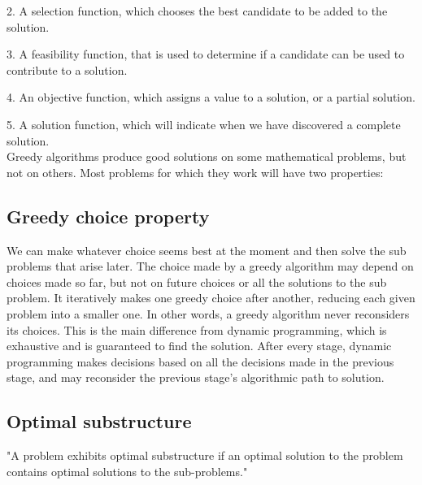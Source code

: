 \documentclass[conference]{IEEEtran}
\begin{document}
2.	A selection function, which chooses the best candidate to be added to the solution.

3.	A feasibility function, that is used to determine if a candidate can be used to contribute to a solution.

4.	An objective function, which assigns a value to a solution, or a partial solution.

5.	A solution function, which will indicate when we have discovered a complete solution.\\

Greedy algorithms produce good solutions on some mathematical problems, but not on others. Most problems for which they work will have two properties:

\subsection{Greedy choice property }

We can make whatever choice seems best at the moment and then solve the sub problems that arise later. The choice made by a greedy algorithm may depend on choices made so far, but not on future choices or all the solutions to the sub problem. It iteratively makes one greedy choice after another, reducing each given problem into a smaller one. In other words, a greedy algorithm never reconsiders its choices. This is the main difference from dynamic programming, which is exhaustive and is guaranteed to find the solution.
After every stage, dynamic programming makes decisions based on all the decisions made in the previous stage, and may reconsider the previous stage's algorithmic path to solution.


\subsection{Optimal substructure }

"A problem exhibits optimal substructure if an optimal solution to the problem contains optimal solutions to the sub-problems."\\
\end{document}
